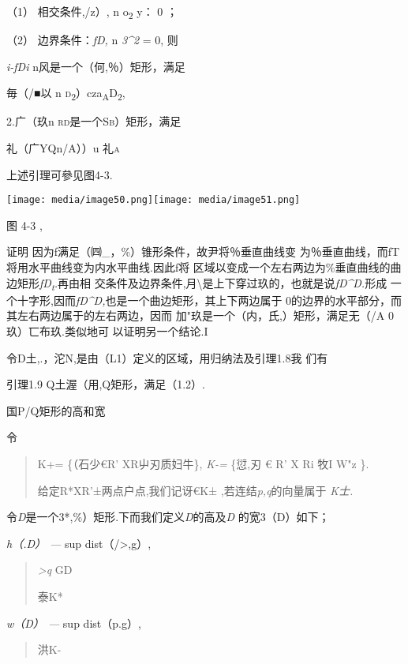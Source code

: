 \documentclass{article}
\begin{document}
（1） 相交条件,/z）, n o\textsubscript{2} y： 0 ；

（2） 边界条件：\emph{fD,} n \emph{3\^{}2} = 0, 则

\emph{i-fDi} n风是一个（何,％）矩形，满足

毎（/■以 n
\textsc{d\textsubscript{2}）}cza\textsubscript{A}D\textsubscript{2},

2.广（玖n \textsc{rd}是一个\textsc{Sb）}矩形，满足

礼（广YQn/A））u 礼\textsc{a}

上述引理可參见图4-3.

\texttt{[image: media/image50.png]}\texttt{[image: media/image51.png]}

图 4-3 ,

证明 因为f满足（㈣\_，\%）锥形条件，故尹将％垂直曲线变
为％垂直曲线，而fT将用水平曲线变为内水平曲线.因此f将
区域以变成一个左右两边为\%垂直曲线的曲边矩形\emph{fD\textsubscript{t}.}再由相
交条件及边界条件,月\textbackslash{}是上下穿过玖的，也就是说\emph{fD\^{}D.}形成
一个十字形,因而\emph{fD\^{}D,}也是一个曲边矩形，其上下两边属于
0的边界的水平部分，而其左右两边属于的左右两边，因而
加\textbar{}\textbar{}"\textbar{}玖是一个（内，氏,）矩形，满足无（/A
0玖）匸布玖.类似地可 以证明另一个结论.I

令D土,.，沱N,是由（L1）定义的区域，用归纳法及引理1.8我 们有

引理1.9 Q土渥（用,Q矩形，满足（1.2）.

国P/Q矩形的高和宽

令

\begin{quote}
K+= \{（石少€R' XR屮刃质妇牛\textbar{}\}, \emph{K-=} \{愆,刃 € R' X
Ri\textbar{} 牧I W"z\textbar{} \}.

给定R*XR'±两点户点,我们记讶€K± ,若连结\emph{p,q}的向量属于 \emph{K士.}
\end{quote}

令\emph{D}是一个3*,\%）矩形.下而我们定义\emph{D}的高及\emph{D}
的宽3（D）如下；

\emph{h（.D） ---} sup dist（/\textgreater{},g）,

\begin{quote}
\emph{\textgreater{}q} GD

泰K*
\end{quote}

\emph{w（D） ---} sup dist（p.g）,

\begin{quote}
洪K-
\end{quote}
\end{document}
